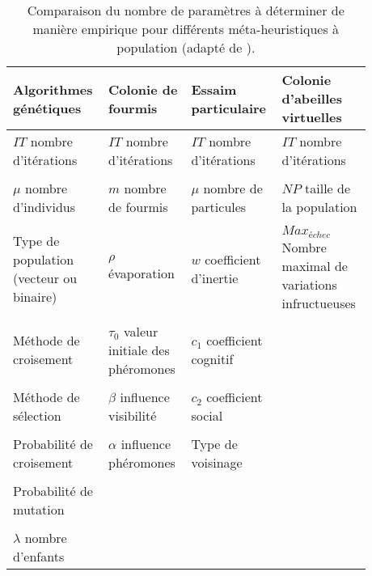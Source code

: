 \begin{table}
\centering
\caption[Nombre de paramètres à déterminer pour différents méta-heuristiques à population]
        {Comparaison du nombre de paramètres à déterminer de manière empirique pour différents
         méta-heuristiques à population (adapté de \cite{Armand-Decker2015}).}
\label{tab:meta_compare}
\small
\begin{tabular}{L{0.22\linewidth} L{0.22\linewidth} L{0.22\linewidth} L{0.22\linewidth}}
    \toprule
    \textbf{Algorithmes génétiques}          & \textbf{Colonie de fourmis}                &  \textbf{Essaim particulaire}   & \textbf{Colonie d’abeilles virtuelles}                  \\
    \midrule
    $IT$ nombre d’itérations                & $IT$ nombre d’itérations                    & $IT$ nombre d’itérations        & $IT$ nombre d’itérations                          \\
    \\
    $\mu$ nombre d’individus                 & $m$ nombre de fourmis                      & $\mu$ nombre de particules       & $NP$ taille de la population                            \\
    \\
    Type de population (vecteur ou binaire)  & $\rho$ évaporation                         & $w$ coefficient d’inertie       & $Max_{échec}$ Nombre maximal de variations infructueuses  \\
    \\
    Méthode de croisement                    & $\tau_{0}$ valeur initiale des phéromones  & $c_{1}$ coefficient cognitif    &                                                         \\
    \\
    Méthode de sélection                     & $\beta$ influence visibilité               & $c_{2}$ coefficient social      &                                                         \\
    \\
    Probabilité de croisement                & $\alpha$ influence phéromones              & Type de voisinage               &                                                         \\
    \\
    Probabilité de mutation                  &                                            &                                 &                                                         \\
    \\
    $\lambda$ nombre d’enfants               &                                            &                                 &                                                         \\
    \bottomrule
\end{tabular}
\end{table}

